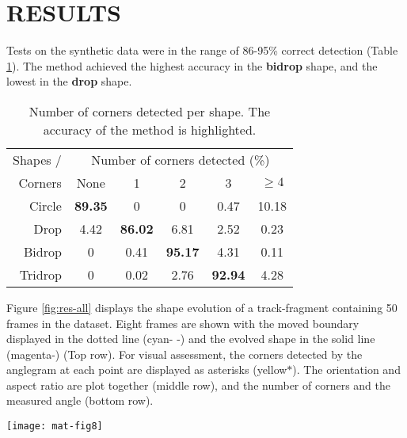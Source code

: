 \vspace{-1em}
\section{RESULTS}\label{sec:results}
\vspace{-0.25em}
Tests on the synthetic data were in the range of 86-95\% correct detection
(Table \ref{tab:synthtests}). The method
achieved the highest accuracy in the \textbf{bidrop} shape, and the lowest in
the \textbf{drop} shape.
\begin{table}[hbpt]
\centering
  \caption{\small
  Number of corners detected per shape. The accuracy of the method
  is highlighted.}
  \begin{tabular}{r|ccccc}
\hline
Shapes / & \multicolumn{5}{c}{Number of corners detected (\%)}\\
Corners & None & 1 & 2 & 3 & $\geq 4$\\
\hline
Circle  & \textbf{89.35} & 0 & 0 & 0.47  & 10.18\\
Drop & 4.42 & \textbf{86.02}  &  6.81 &   2.52  &   0.23\\
Bidrop & 0 & 0.41  &  \textbf{95.17}  &   4.31  &  0.11\\
Tridrop   & 0  &  0.02  &  2.76  &   \textbf{92.94}  &   4.28\\
\hline
  \end{tabular}
  \label{tab:synthtests}
\end{table}
Figure \ref{fig:res-all} displays the shape evolution of a track-fragment containing 50
frames in the dataset. Eight frames are shown with the moved boundary displayed in the
dotted line (cyan- -) and the evolved shape in the solid line (magenta-) (Top row). 
For visual assessment, the corners detected by the anglegram at each point are
displayed as asterisks (yellow$*$).
The orientation and aspect ratio are plot together (middle row), and
the number of corners and the measured angle (bottom row).
\begin{figure*}[hbpt]
    \centering
    \texttt{[image: mat-fig8]}
    \caption[Evolution of a cell shape]{\small
    Evolution of cell shape throughout multiple frames. \textbf{Top row}:
    Eight instances of 50 consecutive frames. Previous segmentation in
    cyan(- -),
    evolved in magenta(-) and corners detected in yellow($*$).
    \textbf{Middle row}: Comparison between the orientation (blue $*-$) and
    the aspect ratio (orange $+-$). The values for the \textbf{top} frames
    are highlighted in blue($\circ$) and black ($\diamond$).
    \textbf{Bottom row}: Minimum intensity projection of \textbf{top}'s'
    respective anglegrams displaying the values of the angles measured
    per corner (red $\diamond$).
    }
    \label{fig:res-all}
\end{figure*}
